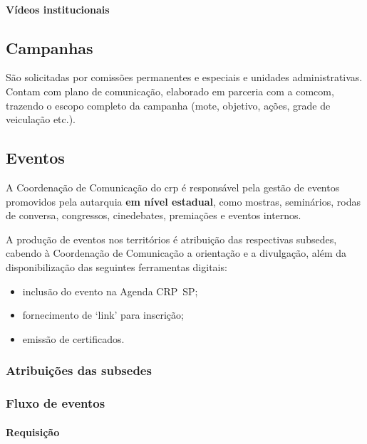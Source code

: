\paragraph{Vídeos institucionais}

\subsection{Campanhas}

São solicitadas por comissões permanentes e especiais e unidades administrativas. Contam com plano de comunicação, elaborado em parceria com a \ac{comcom}, trazendo o escopo completo da campanha (mote, objetivo, ações, grade de veiculação etc.).

\subsection{Eventos}

A Coordenação de Comunicação do \ac{crp} é responsável pela gestão de eventos promovidos pela autarquia \textbf{em nível estadual}, como mostras, seminários, rodas de conversa, congressos, cinedebates, premiações e eventos internos.

A produção de eventos nos territórios é atribuição das respectivas subsedes, cabendo à Coordenação de Comunicação a orientação e a divulgação, além da disponibilização das seguintes ferramentas digitais:

\begin{itemize}
	\item
	inclusão do evento na Agenda CRP~SP;
	\item
	fornecimento de `link' para inscrição;
	\item
	emissão de certificados.
\end{itemize}

\subsubsection{Atribuições das subsedes}

\subsubsection{Fluxo de eventos}

\paragraph{Requisição}

